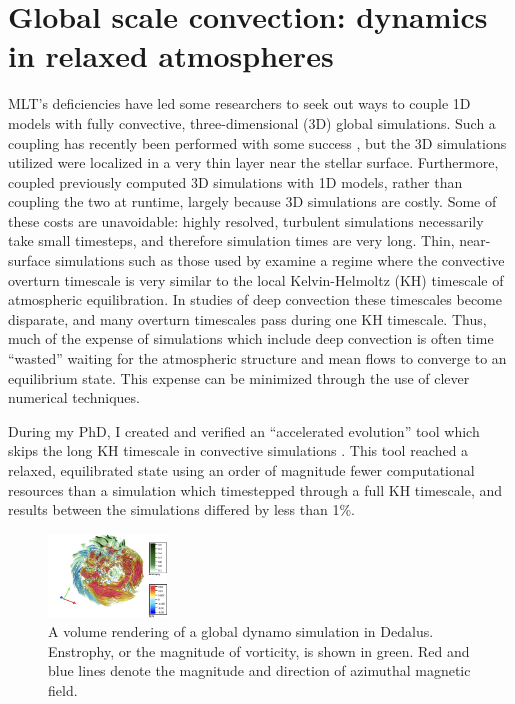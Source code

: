 \documentclass[11pt, preprint, hmargin=1in, vmargin=1in]{aastex62}
\begin{document}
\section{Global scale convection: dynamics in relaxed atmospheres}
MLT's deficiencies have led some researchers to seek out ways to couple 1D models with fully convective, three-dimensional (3D) global simulations.
Such a coupling has recently been performed with some success \citep{jorgensen&weiss2019}, but the 3D simulations utilized were localized in a very thin layer near the stellar surface.
Furthermore, \citet{jorgensen&weiss2019} coupled previously computed 3D simulations with 1D models, rather than coupling the two at runtime, largely because 3D simulations are costly.
Some of these costs are unavoidable: highly resolved, turbulent simulations necessarily take small timesteps, and therefore simulation times are very long.
Thin, near-surface simulations such as those used by \citet{jorgensen&weiss2019} examine a regime where the convective overturn timescale is very similar to the local Kelvin-Helmoltz (KH) timescale of atmospheric equilibration.
In studies of deep convection these timescales become disparate, and many overturn timescales pass during one KH timescale.
Thus, much of the expense of simulations which include deep convection is often time ``wasted'' waiting for the atmospheric structure and mean flows to converge to an equilibrium state.
This expense can be minimized through the use of clever numerical techniques.

During my PhD, I created and verified an ``accelerated evolution'' tool which skips the long KH timescale in convective simulations \citep{anders&all2018}.
This tool reached a relaxed, equilibrated state using an order of magnitude fewer computational resources than a simulation which timestepped through a full KH timescale, and results between the simulations differed by less than 1\%.

\begin{figure}
	\begin{center}
	\vspace{-10pt}
    \includegraphics[width=0.28\textwidth]{./figs/mdwarf.png}
	\vspace{-16pt}
	\end{center}
    \caption{A volume rendering of a global dynamo simulation in Dedalus.
	Enstrophy, or the magnitude of vorticity, is shown in green.
	Red and blue lines denote the magnitude and direction of azimuthal magnetic field.
	\label{fig:mdwarf} }
\end{figure}
\end{document}
